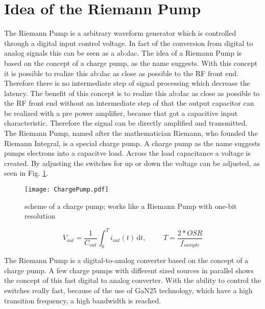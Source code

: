 \section{Idea of the Riemann Pump}
\label{IdeaRiemannPump}
The Riemann Pump is a arbitrary waveform generator which is controlled through a digital input control voltage.
In fact of the conversion from digital to analog signals this can be seen as a \gls{ab:dac}.
The idea of a Riemann Pump is based on the concept of a charge pump, as the name suggests.
With this concept it is possible to realize this \gls{ab:dac} as close as possible to the RF front end.
Therefore there is no intermediate step of signal processing which decrease the latency.
The benefit of this concept is to realize this \gls{ab:dac} as close as possible to the RF front end without an intermediate step of
that the output capacitor can be realized with a pre power amplifier, because that got a capacitive input characteristic.
Therefore the signal can be directly amplified and transmitted.
The Riemann Pump, named after the mathematician Riemann, who founded the Riemann Integral, is a special charge pump. A charge pump as the name suggests pumps electrons into a capacitve load. Across the load capacitance a voltage is created. By adjusting the switches for up or down the voltage can be adjusted, as seen in Fig. \ref{fig:ChargePump}. 

\begin{figure}[ht]
	\centering
  \texttt{[image: ChargePump.pdf]}
	\caption{scheme of a charge pump; works like a Riemann Pump with one-bit resolution}
	\label{fig:ChargePump}
\end{figure}

\begin{equation}
	V_{out} = \frac{1}{C_{out}}{ \int_0^T \! i_{out}(t) \, \mathrm{d}t} , \hspace{1cm} T = \frac{2*OSR}{f_{sample}}
\end{equation}

The Riemann Pump is a digital-to-analog converter based on the concept of a charge pump. A few charge pumps with different sized sources in parallel shows the concept of this fast digital to analog converter. With the ability to control the switches really fast, because of the use of GaN25 technology, which have a high transition frequency, a high bandwidth is reached.

